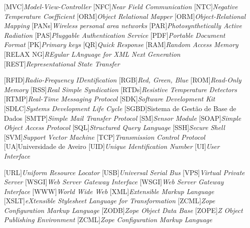 \begin{multicols}{2}
\begin{acronym}[RELAX NG]
	[MVC]{\textit{Model-View-Controller}}
	[NFC]{\textit{Near Field Communication}}
	[NTC]{\textit{Negative Temperature Coefficient}}
	[ORM]{\textit{Object Relational Mapper}}
	[ORM]{\textit{Object-Relational Mapping}}
	[PANs]{\textit{Wireless personal area networks}}
	[PAR]{\textit{Photosynthetically Active Radiation}}
	[PAS]{\textit{Pluggable Authentication Service}}
	[PDF]{\textit{Portable Document Format}}
	[PK]{\textit{Primary keys}}
	[QR]{\textit{Quick Response}}
	[RAM]{\textit{Random Access Memory}}
	[RELAX NG]{\textit{REgular LAnguage for XML Next Generation}}
	[REST]{\textit{Representational State Transfer}}

	[RFID]{\textit{Radio-Frequency IDentification}}
	[RGB]{\textit{Red, Green, Blue}}
	[ROM]{\textit{Read-Only Memory}}
	[RSS]{\textit{Real Simple Syndication}}
	[RTDs]{\textit{Resistive Temperature Detectors}}
	[RTMP]{\textit{Real-Time Messaging Protocol}}
	[SDK]{\textit{Software Development Kit}}
	[SDLC]{\textit{Systems Development Life Cycle}}
	[SGBD]{Sistema de Gestão de Base de Dados}
	[SMTP]{\textit{Simple Mail Transfer Protocol}}
	[SM]{\textit{Sensor Module}}
	[SOAP]{\textit{Simple Object Access Protocol}}
	[SQL]{\textit{Structured Query Language}}
	[SSH]{\textit{Secure Shell}}
	[SVM]{\textit{Support Vector Machine}}
	[TCP]{\textit{Transmission Control Protocol}}
	[UA]{Universidade de Aveiro}
	[UID]{\textit{Unique Identification Number}}
	[UI]{\textit{User Interface}}

	[URL]{\textit{Uniform Resource Locator}}
	[USB]{\textit{Universal Serial Bus}}
	[VPS]{\textit{Virtual Private Server }}
	[WSGI]{\textit{Web Server Gateway Interface }}
	[WSGI]{\textit{Web Server Gateway Interface}}
	[WWW]{\textit{World Wide Web}}
	[XML]{\textit{Extensible Markup Language}}
	[XSLT]{\textit{eXtensible Stylesheet Language for Transformation}}
	[ZCML]{\textit{Zope Configuration Markup Language}}
	[ZODB]{\textit{Zope Object Data Base}}
	[ZOPE]{\textit{Z Object Publishing Environment}}
	[ZCML]{\textit{Zope Configuration Markup Language}}
	
	
\end{acronym}

\end{multicols}

